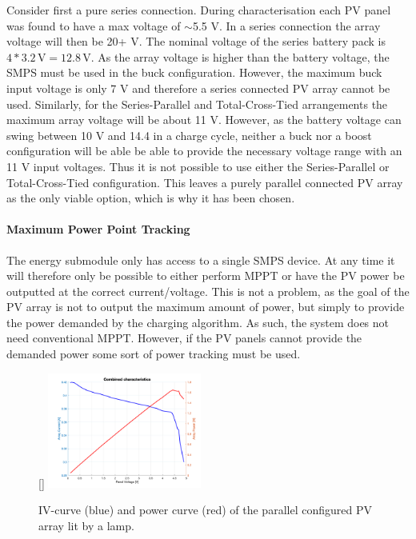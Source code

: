 \documentclass[a4paper]{article}
\newcommand{\unit}[1]{\ensuremath{\, \mathrm{#1}}}
\begin{document}
Consider first a pure series connection. During characterisation each PV 
panel was found to have a max voltage of  $\sim$5.5 V. In a series 
connection the array voltage will then be 20+ V. The nominal voltage of 
the series battery pack is \(4 * 3.2 \unit{V} = 12.8 \unit{V} \). As the 
array voltage is higher than the battery voltage, the SMPS must be used 
in the buck configuration. However, the maximum buck input voltage is 
only 7 V\cite{PMOS} and therefore a series connected PV array cannot be 
used. Similarly, for the Series-Parallel and Total-Cross-Tied arrangements 
the maximum array voltage will be about 11 V. However, as the battery 
voltage can swing between 10 V and 14.4 in a charge cycle, neither a 
buck nor a boost configuration will be able be able to provide the 
necessary voltage range with an 11 V input voltages. Thus it is not 
possible to use either the Series-Parallel or Total-Cross-Tied 
configuration. This leaves a purely parallel connected PV array as 
the only viable option, which is why it has been chosen. 

\paragraph*{Maximum Power Point Tracking}
The energy submodule only has access to a single SMPS device. At any time it 
will therefore only be possible to either perform MPPT or have the PV power 
be outputted at the correct current/voltage. This is not a problem, as the 
goal of the PV array is not to output the maximum amount of power, but simply 
to provide the power demanded by the charging algorithm. As such, the system 
does not need conventional MPPT. However, if the PV panels cannot provide the 
demanded power some sort of power tracking must be used. 

\begin{figure}
    \centering
    \raisebox{-5pt}[\dimexpr{}\baselineskip\relax]{%
        \includegraphics[width=0.45\textwidth]{Combined.png}
    }%
    \vspace{-15pt}
    \caption{IV-curve (blue) and power curve (red) of the parallel configured PV array lit by a lamp.}
    \label{fig:parallelArray}
\end{figure}
\end{document}
